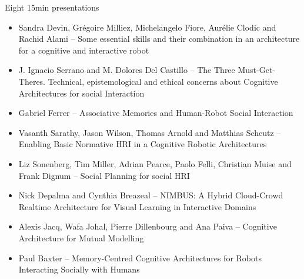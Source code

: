 \documentclass[compress]{beamer}
\begin{document}
\begin{frame}{Eight 15min presentations}
\footnotesize
    \begin{itemize}

\item Sandra Devin, Grégoire Milliez, Michelangelo Fiore, Aurélie Clodic and
    Rachid Alami -- {\Medium Some essential skills and their combination in an
    architecture for a cognitive and interactive robot}

\item J. Ignacio Serrano and M. Dolores Del Castillo -- {\Medium The Three
    Must-Get-Theres.  Technical, epistemological and ethical concerns about
    Cognitive Architectures for social Interaction}

\item Gabriel Ferrer -- {\Medium Associative Memories and Human-Robot Social
    Interaction}

\item Vasanth Sarathy, Jason Wilson, Thomas Arnold and Matthias Scheutz --
    {\Medium Enabling Basic Normative HRI in a Cognitive Robotic Architectures}

\item Liz Sonenberg, Tim Miller, Adrian Pearce, Paolo Felli, Christian Muise and
    Frank Dignum -- {\Medium Social Planning for social HRI}

    \item Nick Depalma and Cynthia Breazeal -- {\Medium NIMBUS: A Hybrid
        Cloud-Crowd Realtime Architecture for Visual Learning in Interactive
    Domains}

\item Alexis Jacq, Wafa Johal, Pierre Dillenbourg and Ana Paiva -- {\Medium
    Cognitive Architecture for Mutual Modelling}

\item Paul Baxter -- {\Medium Memory-Centred Cognitive Architectures for Robots
    Interacting Socially with Humans}

    \end{itemize}
\end{frame}
\end{document}
